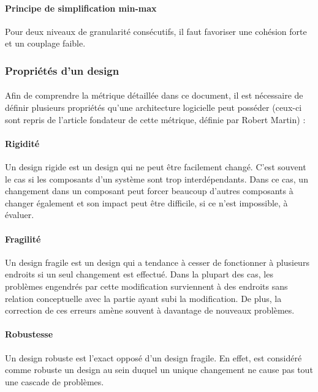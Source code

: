 \documentclass{scrartcl}
\begin{document}
    \paragraph{Principe de simplification min-max}Pour deux niveaux de granularité consécutifs, il faut favoriser une cohésion forte et un couplage faible.

\subsubsection{Propriétés d'un design}

    \paragraph{}Afin de comprendre la métrique détaillée dans ce document, il est nécessaire de définir plusieurs propriétés qu'une architecture logicielle peut posséder (ceux-ci sont repris de l'article fondateur de cette métrique, définie par Robert Martin\cite{Martin:1994}) :

    \paragraph{Rigidité}Un design rigide est un design qui ne peut être facilement changé. C'est souvent le cas si les composants d'un système sont trop interdépendants. Dans ce cas, un changement dans un composant peut forcer beaucoup d'autres composants à changer également et son impact peut être difficile, si ce n'est impossible, à évaluer.

    \paragraph{Fragilité}Un design fragile est un design qui a tendance à cesser de fonctionner à plusieurs endroits si un seul changement est effectué. Dans la plupart des cas, les problèmes engendrés par cette modification surviennent à des endroits sans relation conceptuelle avec la partie ayant subi la modification. De plus, la correction de ces erreurs amène souvent à davantage de nouveaux problèmes.

    \paragraph{Robustesse}Un design robuste est l'exact opposé d'un design fragile. En effet, est considéré comme robuste un design au sein duquel un unique changement ne cause pas tout une cascade de problèmes.
\end{document}
